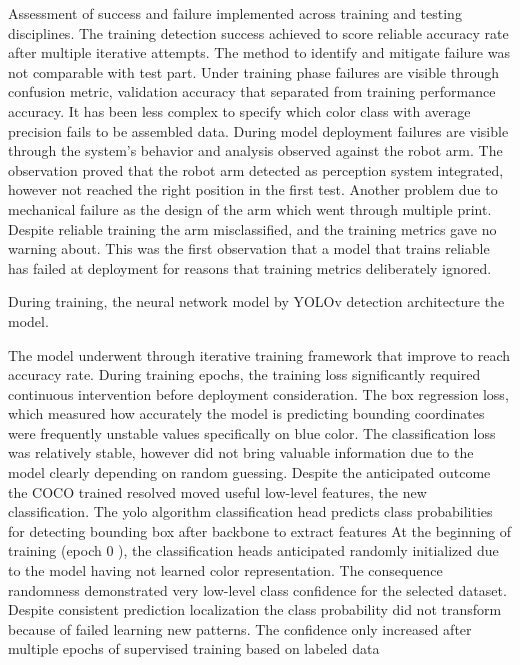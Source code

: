 Assessment of success and failure implemented across training and testing disciplines. The training detection success achieved to score reliable accuracy rate after multiple iterative attempts. The method to identify and mitigate failure was not comparable with test part. Under training phase failures are visible through confusion metric, validation accuracy that separated from training performance accuracy. It has been less complex to specify which color class with average precision fails to be assembled data. During model deployment failures are visible through the system’s behavior and analysis observed against the robot arm. The observation proved that the robot arm detected as perception system integrated, however not reached the right position in the first test. Another problem due to mechanical failure as the design of the arm which went through multiple print. Despite reliable training the arm misclassified, and the training metrics gave no warning about. This was the first observation that a model that trains reliable has failed at deployment for reasons that training metrics deliberately ignored.

During training, the neural network model by YOLOv detection architecture the model.

The model underwent through iterative training framework that improve to reach accuracy rate. During training epochs, the training loss significantly required continuous intervention before deployment consideration. The box regression loss, which measured how accurately the model is predicting bounding coordinates were frequently unstable values specifically on blue color. The classification loss was relatively stable, however did not bring valuable information due to the model clearly depending on random guessing. Despite the anticipated outcome the COCO trained resolved moved useful low-level features, the new classification. The yolo algorithm classification head predicts class probabilities for detecting bounding box after backbone to extract features At the beginning of training (epoch 0 ), the classification heads anticipated randomly initialized due to the model having not learned color representation. The consequence randomness demonstrated very low-level class confidence for the selected dataset. Despite consistent prediction localization the class probability did not transform because of failed learning new patterns. The confidence only increased after multiple epochs of supervised training based on labeled data 


